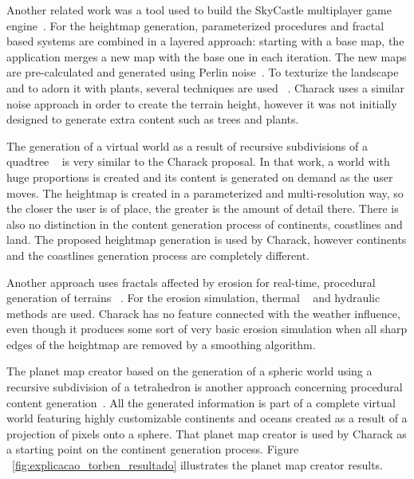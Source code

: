 \documentclass[10pt, conference, compsocconf]{IEEEtran}
\begin{document}
Another related work was a tool used to build the SkyCastle multiplayer game engine~\cite{LandscapeGeneration,SkyCastle}. For the heightmap generation, parameterized procedures and fractal based systems are combined in a layered approach: starting with a base map, the application merges a new map with the base one in each iteration. The new maps are pre-calculated and generated using Perlin noise~\cite{Perlin85}. To texturize the landscape and to adorn it with plants, several techniques are used ~\cite{CSHD03,PL90,LD98,WP95}. Charack uses a similar noise approach in order to create the terrain height, however it was not initially designed to generate extra content such as trees and plants.

The generation of a virtual world as a result of recursive subdivisions of a quadtree ~\cite{dollins-thesis} is very similar to the Charack proposal. In that work, a world with huge proportions is created and its content is generated on demand as the user moves. The heightmap is created in a parameterized and multi-resolution way, so the closer the user is of place, the greater is the amount of detail there. There is also no distinction in the content generation process of continents, coastlines and land. The proposed heightmap generation is used by Charack, however continents and the coastlines generation process are completely different.

Another approach uses fractals affected by erosion for real-time, procedural generation of terrains ~\cite{terrain_generation}. For the erosion simulation, thermal ~\cite{MusgraveErosao} and hydraulic methods are used. Charack has no feature connected with the weather influence, even though it produces some sort of very basic erosion simulation when all sharp edges of the heightmap are removed by a smoothing algorithm.

The planet map creator based on the generation of a spheric world using a recursive subdivision of a tetrahedron is another approach concerning procedural content generation~\cite{torben}. All the generated information is part of a complete virtual world featuring highly customizable continents and oceans created as a result of a projection of pixels onto a sphere. That planet map creator is used by Charack as a starting point on the continent generation process. Figure ~\ref{fig:explicacao_torben_resultado} illustrates the planet map creator results.
\end{document}

